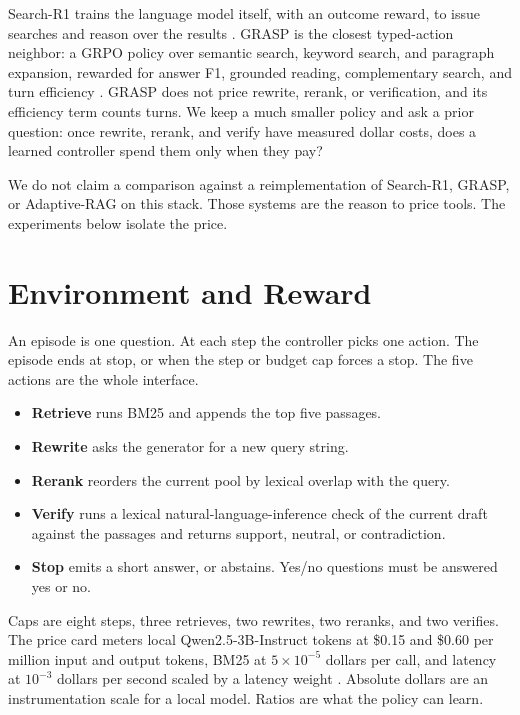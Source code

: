 \documentclass[letterpaper]{article} %
\begin{document}
Search-R1 trains the language model itself, with an outcome reward, to issue searches and reason over the results \cite{jin2025searchr1}. GRASP is the closest typed-action neighbor: a GRPO policy over semantic search, keyword search, and paragraph expansion, rewarded for answer F1, grounded reading, complementary search, and turn efficiency \cite{gandhi2026grasp}. GRASP does not price rewrite, rerank, or verification, and its efficiency term counts turns. We keep a much smaller policy and ask a prior question: once rewrite, rerank, and verify have measured dollar costs, does a learned controller spend them only when they pay?

We do not claim a comparison against a reimplementation of Search-R1, GRASP, or Adaptive-RAG on this stack. Those systems are the reason to price tools. The experiments below isolate the price.

\section{Environment and Reward}
An episode is one question. At each step the controller picks one action. The episode ends at stop, or when the step or budget cap forces a stop. The five actions are the whole interface.

\begin{itemize}
\item \textbf{Retrieve} runs BM25 \cite{robertson2009bm25} and appends the top five passages.
\item \textbf{Rewrite} asks the generator for a new query string.
\item \textbf{Rerank} reorders the current pool by lexical overlap with the query.
\item \textbf{Verify} runs a lexical natural-language-inference check of the current draft against the passages and returns support, neutral, or contradiction.
\item \textbf{Stop} emits a short answer, or abstains. Yes/no questions must be answered yes or no.
\end{itemize}

Caps are eight steps, three retrieves, two rewrites, two reranks, and two verifies. The price card meters local Qwen2.5-3B-Instruct tokens at \$0.15 and \$0.60 per million input and output tokens, BM25 at \(5\times 10^{-5}\) dollars per call, and latency at \(10^{-3}\) dollars per second scaled by a latency weight \cite{qwen2024}. Absolute dollars are an instrumentation scale for a local model. Ratios are what the policy can learn.
\end{document}
